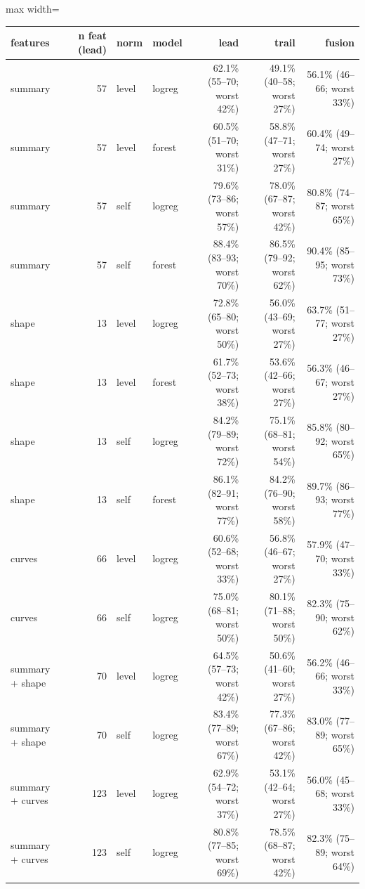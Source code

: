 \begin{adjustbox}{max width=\textwidth}
{\footnotesize
\begin{tabular}{lrllrrr}
\toprule
\textbf{features} & \textbf{n feat (lead)} & \textbf{norm} & \textbf{model} & \textbf{lead} & \textbf{trail} & \textbf{fusion} \\
\midrule
summary & 57 & level & logreg & 62.1\% (55--70; worst 42\%) & 49.1\% (40--58; worst 27\%) & 56.1\% (46--66; worst 33\%) \\
summary & 57 & level & forest & 60.5\% (51--70; worst 31\%) & 58.8\% (47--71; worst 27\%) & 60.4\% (49--74; worst 27\%) \\
summary & 57 & self & logreg & 79.6\% (73--86; worst 57\%) & 78.0\% (67--87; worst 42\%) & 80.8\% (74--87; worst 65\%) \\
summary & 57 & self & forest & 88.4\% (83--93; worst 70\%) & 86.5\% (79--92; worst 62\%) & 90.4\% (85--95; worst 73\%) \\
shape & 13 & level & logreg & 72.8\% (65--80; worst 50\%) & 56.0\% (43--69; worst 27\%) & 63.7\% (51--77; worst 27\%) \\
shape & 13 & level & forest & 61.7\% (52--73; worst 38\%) & 53.6\% (42--66; worst 27\%) & 56.3\% (46--67; worst 27\%) \\
shape & 13 & self & logreg & 84.2\% (79--89; worst 72\%) & 75.1\% (68--81; worst 54\%) & 85.8\% (80--92; worst 65\%) \\
shape & 13 & self & forest & 86.1\% (82--91; worst 77\%) & 84.2\% (76--90; worst 58\%) & 89.7\% (86--93; worst 77\%) \\
curves & 66 & level & logreg & 60.6\% (52--68; worst 33\%) & 56.8\% (46--67; worst 27\%) & 57.9\% (47--70; worst 33\%) \\
curves & 66 & self & logreg & 75.0\% (68--81; worst 50\%) & 80.1\% (71--88; worst 50\%) & 82.3\% (75--90; worst 62\%) \\
summary + shape & 70 & level & logreg & 64.5\% (57--73; worst 42\%) & 50.6\% (41--60; worst 27\%) & 56.2\% (46--66; worst 33\%) \\
summary + shape & 70 & self & logreg & 83.4\% (77--89; worst 67\%) & 77.3\% (67--86; worst 42\%) & 83.0\% (77--89; worst 65\%) \\
summary + curves & 123 & level & logreg & 62.9\% (54--72; worst 37\%) & 53.1\% (42--64; worst 27\%) & 56.0\% (45--68; worst 33\%) \\
summary + curves & 123 & self & logreg & 80.8\% (77--85; worst 69\%) & 78.5\% (68--87; worst 42\%) & 82.3\% (75--89; worst 64\%) \\
\bottomrule
\end{tabular}
}
\end{adjustbox}
